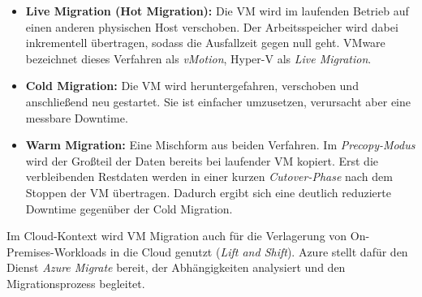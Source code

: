 \begin{itemize}
    \item \textbf{Live Migration (Hot Migration):} Die VM wird im
    laufenden Betrieb auf einen anderen physischen Host verschoben. Der
    Arbeitsspeicher wird dabei inkrementell übertragen, sodass die Ausfallzeit
    gegen null geht. VMware bezeichnet dieses Verfahren als \textit{vMotion},
    Hyper-V als \textit{Live Migration}.

    \item \textbf{Cold Migration:} Die VM wird heruntergefahren,
    verschoben und anschließend neu gestartet. Sie ist einfacher umzusetzen,
    verursacht aber eine messbare Downtime.

    \item \textbf{Warm Migration:} Eine Mischform aus beiden Verfahren.
    Im \textit{Precopy-Modus} wird der Großteil der Daten bereits bei
    laufender VM kopiert. Erst die verbleibenden Restdaten werden in einer
    kurzen \textit{Cutover-Phase} nach dem Stoppen der VM übertragen. Dadurch
    ergibt sich eine deutlich reduzierte Downtime gegenüber der Cold Migration.
\end{itemize}

Im Cloud-Kontext wird VM Migration auch für die Verlagerung von
On-Premises-Workloads in die Cloud genutzt (\textit{Lift and Shift}).
Azure stellt dafür den Dienst \textit{Azure Migrate} bereit, der Abhängigkeiten
analysiert und den Migrationsprozess begleitet.
